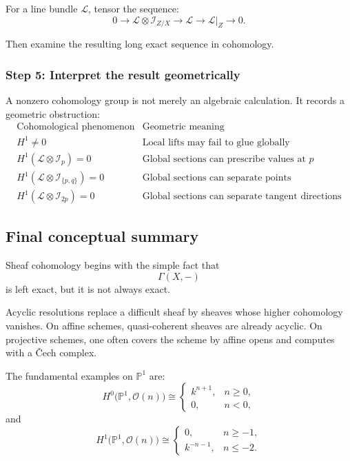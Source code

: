 \documentclass[12pt,a4paper]{article}
\theoremstyle{notespace}
\begin{document}
For a line bundle \(\mathcal{L}\), tensor the sequence:
\[
0
\longrightarrow
\mathcal{L}\otimes\mathcal{I}_{Z/X}
\longrightarrow
\mathcal{L}
\longrightarrow
\mathcal{L}|_{Z}
\longrightarrow
0.
\]

Then examine the resulting long exact sequence in cohomology.

\subsubsection{Step 5: Interpret the result geometrically}

A nonzero cohomology group is not merely an algebraic calculation. It records
a geometric obstruction:
\[
\begin{array}{c|c}
	\text{Cohomological phenomenon}
	&
	\text{Geometric meaning}
	\\
	\hline
	H^{1}\neq 0
	&
	\text{Local lifts may fail to glue globally}
	\\[4pt]
	H^{1}(\mathcal{L}\otimes\mathcal{I}_{p})=0
	&
	\text{Global sections can prescribe values at }p
	\\[4pt]
	H^{1}(\mathcal{L}\otimes\mathcal{I}_{\{p,q\}})=0
	&
	\text{Global sections can separate points}
	\\[4pt]
	H^{1}(\mathcal{L}\otimes\mathcal{I}_{2p})=0
	&
	\text{Global sections can separate tangent directions}
\end{array}
\]

\subsection{Final conceptual summary}

Sheaf cohomology begins with the simple fact that
\[
\Gamma(X,-)
\]
is left exact, but it is not always exact.

Acyclic resolutions replace a difficult sheaf by sheaves whose higher
cohomology vanishes. On affine schemes, quasi-coherent sheaves are already
acyclic. On projective schemes, one often covers the scheme by affine opens
and computes with a Čech complex.

The fundamental examples on \(\mathbb{P}^{1}\) are:
\[
H^{0}\bigl(\mathbb{P}^{1},\mathcal{O}(n)\bigr)
\cong
\begin{cases}
	k^{n+1}, & n\geq 0,\\
	0, & n<0,
\end{cases}
\]
and
\[
H^{1}\bigl(\mathbb{P}^{1},\mathcal{O}(n)\bigr)
\cong
\begin{cases}
	0, & n\geq -1,\\
	k^{-n-1}, & n\leq -2.
\end{cases}
\]
\end{document}
